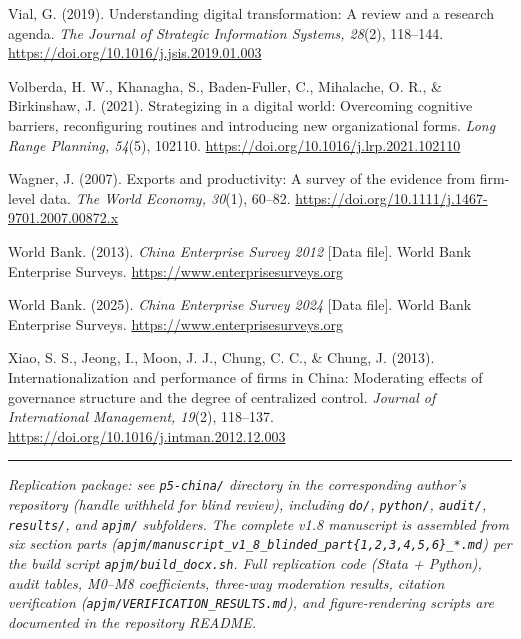 \documentclass[12pt,a4paper]{article}
\begin{document}
Vial, G. (2019). Understanding digital transformation: A review and a
research agenda. \emph{The Journal of Strategic Information Systems,
28}(2), 118--144. \url{https://doi.org/10.1016/j.jsis.2019.01.003}

Volberda, H. W., Khanagha, S., Baden-Fuller, C., Mihalache, O. R., \&
Birkinshaw, J. (2021). Strategizing in a digital world: Overcoming
cognitive barriers, reconfiguring routines and introducing new
organizational forms. \emph{Long Range Planning, 54}(5), 102110.
\url{https://doi.org/10.1016/j.lrp.2021.102110}

Wagner, J. (2007). Exports and productivity: A survey of the evidence
from firm-level data. \emph{The World Economy, 30}(1), 60--82.
\url{https://doi.org/10.1111/j.1467-9701.2007.00872.x}

World Bank. (2013). \emph{China Enterprise Survey 2012} {[}Data file{]}.
World Bank Enterprise Surveys. \url{https://www.enterprisesurveys.org}

World Bank. (2025). \emph{China Enterprise Survey 2024} {[}Data file{]}.
World Bank Enterprise Surveys. \url{https://www.enterprisesurveys.org}

Xiao, S. S., Jeong, I., Moon, J. J., Chung, C. C., \& Chung, J. (2013).
Internationalization and performance of firms in China: Moderating
effects of governance structure and the degree of centralized control.
\emph{Journal of International Management, 19}(2), 118--137.
\url{https://doi.org/10.1016/j.intman.2012.12.003}

\begin{center}\rule{0.5\linewidth}{0.5pt}\end{center}

\emph{Replication package: see \texttt{p5-china/} directory in the
corresponding author's repository (handle withheld for blind review),
including \texttt{do/}, \texttt{python/}, \texttt{audit/},
\texttt{results/}, and \texttt{apjm/} subfolders. The complete v1.8
manuscript is assembled from six section parts
(\texttt{apjm/manuscript\_v1\_8\_blinded\_part\{1,2,3,4,5,6\}\_*.md})
per the build script \texttt{apjm/build\_docx.sh}. Full replication code
(Stata + Python), audit tables, M0--M8 coefficients, three-way
moderation results, citation verification
(\texttt{apjm/VERIFICATION\_RESULTS.md}), and figure-rendering scripts
are documented in the repository README.}
\end{document}
